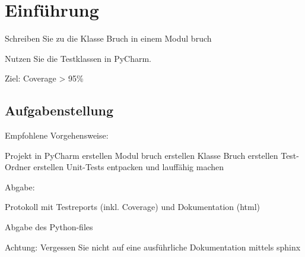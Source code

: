
\section{Einführung}

Schreiben Sie zu die Klasse Bruch in einem Modul bruch

Nutzen Sie die Testklassen  in PyCharm.

Ziel: Coverage > 95\%

\subsection{Aufgabenstellung}

Empfohlene Vorgehensweise:

    Projekt in PyCharm erstellen
    Modul bruch erstellen
    Klasse Bruch erstellen
    Test-Ordner erstellen
    Unit-Tests entpacken und lauffähig machen

Abgabe:

Protokoll mit Testreports (inkl. Coverage) und Dokumentation (html)

Abgabe des Python-files

Achtung: Vergessen Sie nicht auf eine ausführliche Dokumentation mittels sphinx


%
\clearpage
